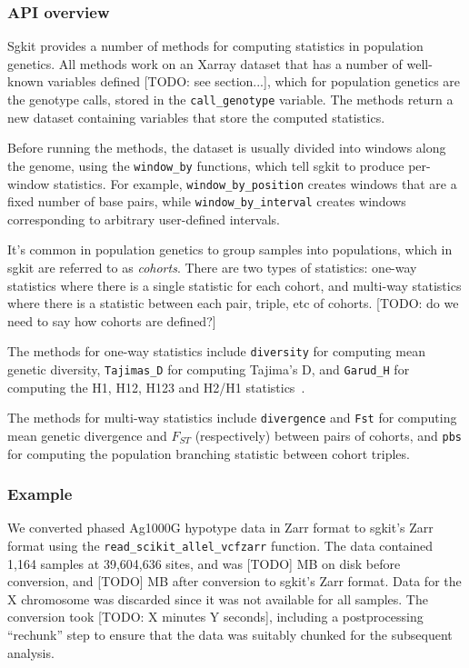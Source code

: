 \documentclass[9pt,lineno]{elife}
\newcommand{\sgapi}[1]{\texttt{#1}}
\begin{document}
\subsubsection{API overview}

Sgkit provides a number of methods for computing statistics in population
genetics. All methods work on an Xarray dataset that has a number of well-known
variables defined [TODO: see section...], which for population genetics are the
genotype calls, stored in the \sgapi{call\_genotype} variable. The methods return a
new dataset containing variables that store the computed statistics.

Before running the methods, the dataset is usually divided into windows along
the genome, using the \sgapi{window\_by} functions, which tell sgkit to produce
per-window statistics. For example, \sgapi{window\_by\_position} creates windows that
are a fixed number of base pairs, while \sgapi{window\_by\_interval} creates windows
corresponding to arbitrary user-defined intervals.

It's common in population genetics to group samples into populations, which in
sgkit are referred to as \emph{cohorts}. There are two types of statistics: one-way
statistics where there is a single statistic for each cohort, and multi-way
statistics where there is a statistic between each pair, triple, etc of
cohorts. [TODO: do we need to say how cohorts are defined?]

The methods for one-way statistics include \sgapi{diversity} for computing mean
genetic diversity, \sgapi{Tajimas\_D} for computing Tajima’s D, and
\sgapi{Garud\_H} for
computing the H1, H12, H123 and H2/H1 statistics~\citep{garud2015recent}.

The methods for multi-way statistics include \sgapi{divergence} and
\sgapi{Fst} for
computing mean genetic divergence and $F_{ST}$ (respectively) between pairs of
cohorts, and \sgapi{pbs} for computing the population branching statistic between
cohort triples.

\subsubsection{Example}

We converted phased Ag1000G hypotype data in Zarr format
to sgkit's Zarr format
using the \sgapi{read\_scikit\_allel\_vcfzarr} function.
The data contained 1,164
samples at 39,604,636 sites, and was [TODO] MB on disk before conversion, and
[TODO] MB after conversion to sgkit's Zarr format. Data for the X chromosome
was discarded since it was not available for all samples. The conversion took
[TODO: X minutes Y seconds], including a postprocessing ``rechunk'' step to
ensure that the data was suitably chunked for the subsequent analysis.
\end{document}
